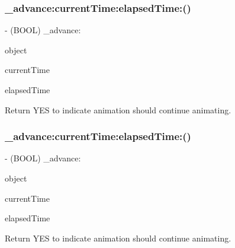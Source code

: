 \subsubsection{\texorpdfstring{\+\_\+advance\+:current\+Time\+:elapsed\+Time\+:()}{\_advance:currentTime:elapsedTime:()}\hspace{0.1cm}{\footnotesize\ttfamily [1/2]}}
{\footnotesize\ttfamily -\/ (B\+O\+OL) \+\_\+advance\+: \begin{DoxyParamCaption}\item[{(id)}]{object }\item[{currentTime:(C\+F\+Time\+Interval)}]{current\+Time }\item[{elapsedTime:(C\+F\+Time\+Interval)}]{elapsed\+Time }\end{DoxyParamCaption}\hspace{0.3cm}{\ttfamily [implementation]}}

Return Y\+ES to indicate animation should continue animating. \mbox{\label{interface_p_o_p_animation_a2156e24577e9e6b3dddf47c6b4249e7f}} 
\subsubsection{\texorpdfstring{\+\_\+advance\+:current\+Time\+:elapsed\+Time\+:()}{\_advance:currentTime:elapsedTime:()}\hspace{0.1cm}{\footnotesize\ttfamily [2/2]}}
{\footnotesize\ttfamily -\/ (B\+O\+OL) \+\_\+advance\+: \begin{DoxyParamCaption}\item[{(id)}]{object }\item[{currentTime:(C\+F\+Time\+Interval)}]{current\+Time }\item[{elapsedTime:(C\+F\+Time\+Interval)}]{elapsed\+Time }\end{DoxyParamCaption}\hspace{0.3cm}{\ttfamily [implementation]}}

Return Y\+ES to indicate animation should continue animating. \mbox{\label{interface_p_o_p_animation_a4558b9f70108f420d045f2605eb76507}} 
